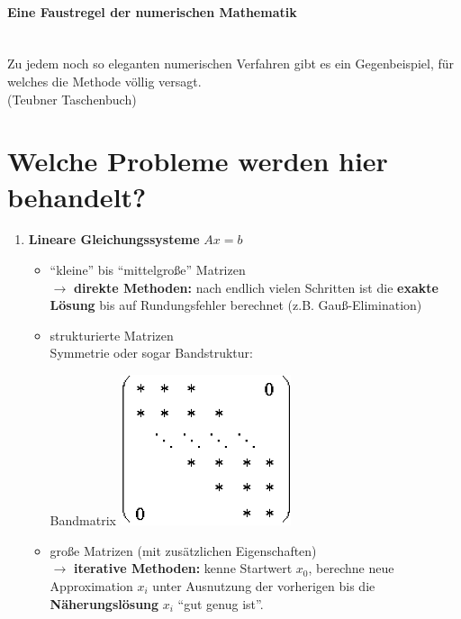 \paragraph{Eine Faustregel der numerischen Mathematik}~\\
Zu jedem noch so eleganten numerischen Verfahren gibt es ein Gegenbeispiel,
für welches die Methode völlig versagt. \\
{\small (Teubner Taschenbuch)}

\section*{Welche Probleme werden hier behandelt?}
\begin{enumerate}
\item \textbf{Lineare Gleichungssysteme} $Ax=b$ 
  \begin{itemize}
  \item \enquote{kleine} bis \enquote{mittelgroße} Matrizen\\
    $\rightarrow$ \textbf{direkte Methoden:} nach endlich vielen
    Schritten ist die \textbf{exakte Lösung} bis auf
    Rundungsfehler berechnet (z.B. Gauß-Elimination)
  \item strukturierte Matrizen \\
    Symmetrie oder sogar Bandstruktur:
    \begin{image}{Bandmatrix}
      \includegraphics[width=5cm]{images/band.jpg}  
    \end{image}
    
    
  \item große Matrizen (mit zusätzlichen Eigenschaften)\\
    $\rightarrow$ \textbf{iterative Methoden:} kenne Startwert
    $x_0$, berechne neue Approximation $x_i$ unter
    Ausnutzung der vorherigen bis die
    \textbf{Näherungslösung} $x_i$ \enquote{gut genug ist}.
  \end{itemize}
  

\end{enumerate}
